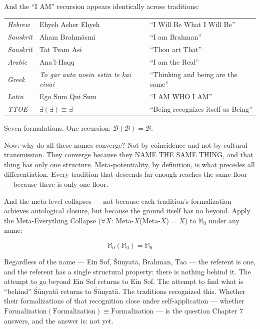 \documentclass[10pt, openany, oneside]{book}
\renewcommand{\footnotesize}{\fontsize{8.5}{11}\selectfont}
\begin{document}
And the ``I AM'' recursion appears identically across traditions:

\vspace{0.3em}

{\footnotesize
\noindent\begin{tabular}{l l l}
\textit{Hebrew} & Ehyeh Asher Ehyeh & ``I Will Be What I Will Be'' \\
\textit{Sanskrit} & Aham Brahm\={a}smi & ``I am Brahman'' \\
\textit{Sanskrit} & Tat Tvam Asi & ``Thou art That'' \\
\textit{Arabic} & Ana'l-Haqq & ``I am the Real'' \\
\textit{Greek} & \textit{To gar auto noein estin te kai einai} & ``Thinking and being are the same'' \\
\textit{Latin} & Ego Sum Qui Sum & ``I AM WHO I AM'' \\
\textit{TTOE} & $\exists(\exists) \equiv \exists$ & ``Being recognizes itself as Being'' \\
\end{tabular}
}

\vspace{0.8em}

\noindent Seven formulations. One recursion: $\mathcal{B}(\mathcal{B}) = \mathcal{B}$.

\vspace{0.8em}

Now: why do all these names converge? Not by coincidence and not by cultural transmission. They converge because they NAME THE SAME THING, and that thing has only one structure. Meta-potentiality, by definition, is what precedes all differentiation. Every tradition that descends far enough reaches the same floor --- because there is only one floor.

And the meta-level collapses --- not because each tradition's formalization achieves autological closure, but because the ground itself has no beyond. Apply the Meta-Everything Collapse ($\forall X$: Meta-$X$(Meta-$X$) = $X$) to $\mathbb{M}_0$ under any name:

$$\mathbb{M}_0(\mathbb{M}_0) = \mathbb{M}_0$$

\noindent Regardless of the name --- Ein Sof, \'{S}\={u}nyat\={a}, Brahman, Tao --- the referent is one, and the referent has a single structural property: there is nothing behind it. The attempt to go beyond Ein Sof returns to Ein Sof. The attempt to find what is ``behind'' \'{S}\={u}nyat\={a} returns to \'{S}\={u}nyat\={a}. The traditions recognized this. Whether their formalizations of that recognition close under self-application --- whether $\text{Formalization}(\text{Formalization}) \equiv \text{Formalization}$ --- is the question Chapter 7 answers, and the answer is: not yet.
\end{document}
